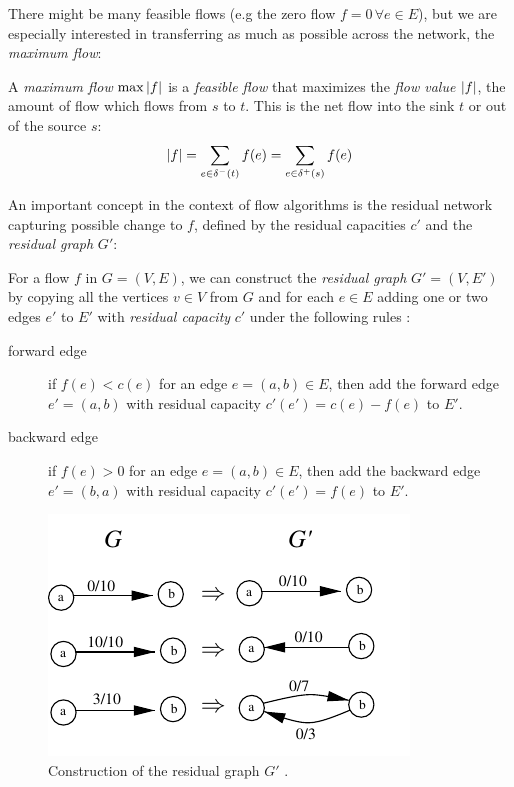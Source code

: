 There might be many feasible flows (e.g the zero flow $f = 0 \, \forall e \in E$), but we are especially interested in transferring as much as possible across the network, the \textit{maximum flow}:
\begin{problem}
A \textit{maximum flow} $\max \left\lvert f\right\rvert$ is a \textit{feasible flow} that maximizes the \textit{flow value} $\left\lvert f\right\rvert$, the amount of flow which flows from $s$ to $t$. This is the net flow into the sink $t$ or out of the source $s$:
\begin{equation*}
\left\lvert f\right\rvert = \sum_{e \in \delta^-(t)} f(e) = \sum_{e \in \delta^+(s)} f(e)
\end{equation*}
\end{problem}


An important concept in the context of flow algorithms is the residual network capturing possible change to $f$, defined by the residual capacities $c'$ and the \textit{residual graph} $G'$:
\begin{definition}
For a flow $f$ in $G=(V,E)$, we can construct the \textit{residual graph} $G' = (V,E')$ by copying all the vertices $v \in V$ from $G$ and for each $e \in E$ adding one or two edges $e'$ to $E'$ with \textit{residual capacity} $c'$ under the following rules :
\begin{description}
\item[forward edge] if $f(e) < c(e)$ for an edge $e=(a,b) \in E$, then add the forward edge $e' = (a,b)$ with residual capacity $c'(e') = c(e) - f(e)$ to $E'$.
\item[backward edge] if $f(e) > 0$ for an edge $e=(a,b) \in E$, then add the backward edge $e' = (b,a)$ with residual capacity $c'(e') = f(e)$ to $E'$.
\end{description}
\end{definition}

\begin{figure}
\centering
\includegraphics[]{fig/residual}
\caption{Construction of the residual graph $G'$ \cite{mayer2013prakt}.}
\label{fig:residual}
\end{figure}


